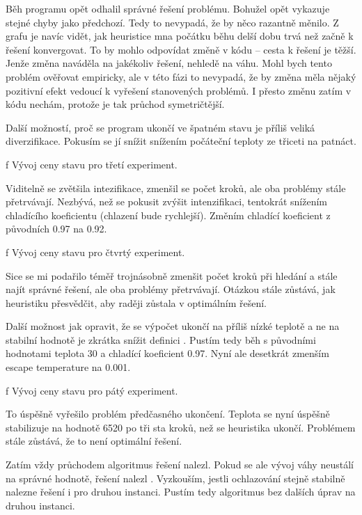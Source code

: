Běh programu opět odhalil správné řešení problému. Bohužel opět vykazuje stejné chyby jako předchozí. Tedy to nevypadá, že by něco razantně měnilo. Z grafu je navíc vidět, jak heuristice mna počátku běhu delší dobu trvá než začně k řešení konvergovat. To by mohlo odpovídat změně v kódu -- cesta k řešení je těžší. Jenže změna naváděla na jakékoliv řešení, nehledě na váhu. Mohl bych tento problém ověřovat empiricky, ale v této fázi to nevypadá, že by změna měla nějaký pozitivní efekt vedoucí k vyřešení stanovených problémů. I přesto změnu zatím v kódu nechám, protože je tak průchod symetričtější.

Další možností, proč se program ukončí ve špatném stavu je příliš veliká diverzifikace. Pokusím se jí snížit snížením počáteční teploty ze třiceti na patnáct.

\centerline{ \picwidth=15cm  }
\caption/f Vývoj ceny stavu pro třetí experiment.
\bigskip

Viditelně se zvětšila intezifikace, zmenšil se počet kroků, ale oba problémy stále přetrvávají. Nezbývá, než se pokusit zvýšit intenzifikaci, tentokrát snížením chladícího koeficientu (chlazení bude rychlejší). Změním chladící koeficient z původních 0.97 na 0.92.

\centerline{ \picwidth=15cm  }
\caption/f Vývoj ceny stavu pro čtvrtý experiment.
\bigskip

Sice se mi podařilo téměř trojnásobně zmenšit počet kroků při hledání a stále najít správné řešení, ale oba problémy přetrvávají. Otázkou stále zůstává, jak heuristiku přesvědčit, aby raději zůstala v optimálním řešení.

Další možnost jak opravit, že se výpočet ukončí na příliš nízké teplotě a ne na stabilní hodnotě je zkrátka snížit definici . Pustím tedy běh s původními hodnotami teplota 30 a chladící koeficient 0.97. Nyní ale desetkrát zmenším escape temperature na 0.001.

\centerline{ \picwidth=15cm  }
\caption/f Vývoj ceny stavu pro pátý experiment.
\bigskip

To úspěšně vyřešilo problém předčasného ukončení. Teplota se nyní úspěšně stabilizuje na hodnotě 6520 po tři sta kroků, než se heuristika ukončí. Problémem stále zůstává, že to není optimální řešení.

Zatím vždy průchodem algoritmus řešení nalezl. Pokud se ale vývoj váhy neustálí na správné hodnotě, řešení nalezl . Vyzkouším, jestli ochlazování stejně stabilně nalezne řešení i pro druhou instanci. Pustím tedy algoritmus bez dalších úprav na druhou instanci.

